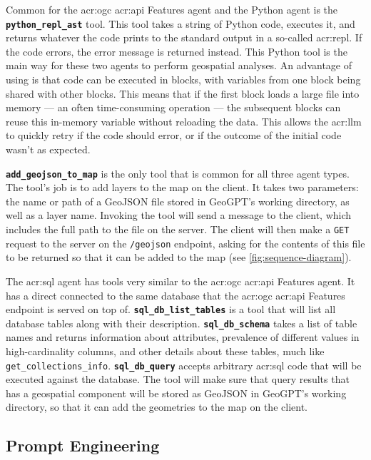 Common for the \acrshort{acr:ogc} \acrshort{acr:api} Features agent and the Python agent is the \textbf{\texttt{python\_repl\_ast}} tool. This tool takes a string of Python code, executes it, and returns whatever the code prints to the standard output in a so-called \acrfull{acr:repl}. If the code errors, the error message is returned instead. This Python tool is the main way for these two agents to perform geospatial analyses. An advantage of using  is that code can be executed in blocks, with variables from one block being shared with other blocks. This means that if the first block loads a large file into memory --- an often time-consuming operation --- the subsequent blocks can reuse this in-memory variable without reloading the data. This allows the \acrshort{acr:llm} to quickly retry if the code should error, or if the outcome of the initial code wasn't as expected.

\textbf{\texttt{add\_geojson\_to\_map}} is the only tool that is common for all three agent types. The tool's job is to add layers to the map on the client. It takes two parameters: the name or path of a GeoJSON file stored in GeoGPT's working directory, as well as a layer name. Invoking the tool will send a message to the client, which includes the full path to the file on the server. The client will then make a \texttt{GET} request to the server on the \texttt{/geojson} endpoint, asking for the contents of this file to be returned so that it can be added to the map (see \autoref{fig:sequence-diagram}).

The \acrshort{acr:sql} agent has tools very similar to the \acrshort{acr:ogc} \acrshort{acr:api} Features agent. It has a direct connected to the same database that the \acrshort{acr:ogc} \acrshort{acr:api} Features endpoint is served on top of. \textbf{\texttt{sql\_db\_list\_tables}} is a tool that will list all database tables along with their description. \textbf{\texttt{sql\_db\_schema}} takes a list of table names and returns information about attributes, prevalence of different values in high-cardinality columns, and other details about these tables, much like \texttt{get\_collections\_info}. \textbf{\texttt{sql\_db\_query}} accepts arbitrary \acrshort{acr:sql} code that will be executed against the database. The tool will make sure that query results that has a geospatial component will be stored as GeoJSON in GeoGPT's working directory, so that it can add the geometries to the map on the client.


\subsection{Prompt Engineering}
\label{subsec:prompt-engineering-architecture}

